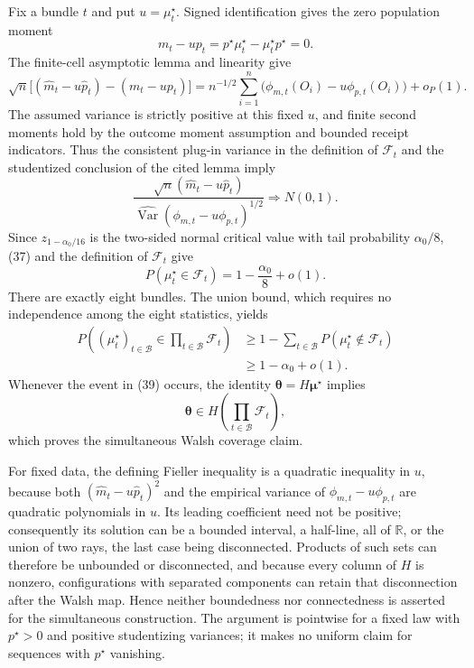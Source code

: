Fix a bundle \(t\) and put \(u=\mu_t^\star\).  Signed identification gives the zero population moment
\[
m_t-u p_t=p^\star\mu_t^\star-\mu_t^\star p^\star=0. \tag{35}
\]
The finite-cell asymptotic lemma and linearity give
\[
\sqrt n\bigl[(\widehat m_t-u\widehat p_t)-(m_t-u p_t)\bigr]
=n^{-1/2}\sum_{i=1}^n
\bigl(\phi_{m,t}(O_i)-u\phi_{p,t}(O_i)\bigr)+o_P(1). \tag{36}
\]
The assumed variance is strictly positive at this fixed \(u\), and finite second moments hold by the outcome moment assumption and bounded receipt indicators.  Thus the consistent plug-in variance in the definition of \(\mathcal F_t\) and the studentized conclusion of the cited lemma imply
\[
\frac{\sqrt n(\widehat m_t-u\widehat p_t)}
{\widehat{\operatorname{Var}}(\phi_{m,t}-u\phi_{p,t})^{1/2}}
\Rightarrow N(0,1). \tag{37}
\]
Since \(z_{1-\alpha_0/16}\) is the two-sided normal critical value with tail probability \(\alpha_0/8\), (37) and the definition of \(\mathcal F_t\) give
\[
P(\mu_t^\star\in\mathcal F_t)=1-\frac{\alpha_0}{8}+o(1). \tag{38}
\]
There are exactly eight bundles.  The union bound, which requires no independence among the eight statistics, yields
\[
\begin{aligned}
P\left((\mu_t^\star)_{t\in\mathcal B}
 \in\prod_{t\in\mathcal B}\mathcal F_t\right)
&\ge1-\sum_{t\in\mathcal B}P(\mu_t^\star\notin\mathcal F_t)\\
&\ge1-\alpha_0+o(1).
\end{aligned} \tag{39}
\]
Whenever the event in (39) occurs, the identity \(\boldsymbol\theta=H\boldsymbol\mu^\star\) implies
\[
\boldsymbol\theta\in H\left(\prod_{t\in\mathcal B}\mathcal F_t\right),
\]
which proves the simultaneous Walsh coverage claim.

For fixed data, the defining Fieller inequality is a quadratic inequality in \(u\), because both \((\widehat m_t-u\widehat p_t)^2\) and the empirical variance of \(\phi_{m,t}-u\phi_{p,t}\) are quadratic polynomials in \(u\).  Its leading coefficient need not be positive; consequently its solution can be a bounded interval, a half-line, all of \(\mathbb R\), or the union of two rays, the last case being disconnected.  Products of such sets can therefore be unbounded or disconnected, and because every column of \(H\) is nonzero, configurations with separated components can retain that disconnection after the Walsh map.  Hence neither boundedness nor connectedness is asserted for the simultaneous construction.  The argument is pointwise for a fixed law with \(p^\star>0\) and positive studentizing variances; it makes no uniform claim for sequences with \(p^\star\) vanishing.

